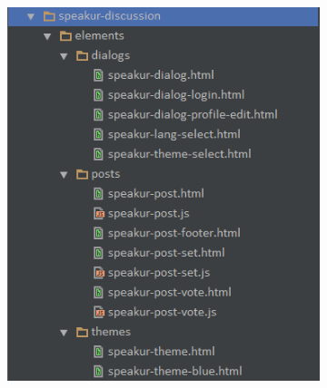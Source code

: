 \begin{figure}[htb]
	\centering
	\begin{subfigure}[b]{0.48\textwidth}
		\includegraphics[width=\textwidth]{images/file_layout_a.png}
	\end{subfigure} %
	\begin{subfigure}[b]{0.48\textwidth}

\end{subfigure}
\end{figure}
